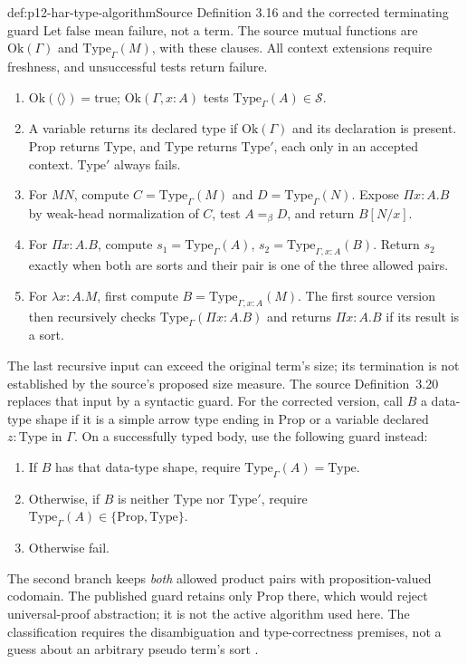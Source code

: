 \begin{hbdefinition}{def:p12-har-type-algorithm}{Source Definition 3.16 and the corrected terminating guard}
Let \(\mathrm{false}\) mean failure, not a term. The source mutual
functions are \(\mathrm{Ok}(\Gamma)\) and
\(\mathrm{Type}_\Gamma(M)\), with these clauses. All context
extensions require freshness, and unsuccessful tests return failure.
\begin{enumerate}
 \item \(\mathrm{Ok}(\langle\rangle)=\mathrm{true}\);
 \(\mathrm{Ok}(\Gamma,x:A)\) tests
 \(\mathrm{Type}_\Gamma(A)\in\mathcal S\).
 \item A variable returns its declared type if
 \(\mathrm{Ok}(\Gamma)\) and its declaration is present.
 \(\mathrm{Prop}\) returns \(\mathrm{Type}\), and
 \(\mathrm{Type}\) returns \(\mathrm{Type}'\), each only in an
 accepted context. \(\mathrm{Type}'\) always fails.
 \item For \(MN\), compute \(C=\mathrm{Type}_\Gamma(M)\)
 and \(D=\mathrm{Type}_\Gamma(N)\). Expose
 \(\Pi x:A.B\) by weak-head normalization of \(C\), test
 \(A=_\beta D\), and return \(B[N/x]\).
 \item For \(\Pi x:A.B\), compute
 \(s_1=\mathrm{Type}_\Gamma(A)\),
 \(s_2=\mathrm{Type}_{\Gamma,x:A}(B)\). Return \(s_2\)
 exactly when both are sorts and their pair is one of the three allowed
 pairs.
 \item For \(\lambda x:A.M\), first compute
 \(B=\mathrm{Type}_{\Gamma,x:A}(M)\). The first source version
 then recursively checks \(\mathrm{Type}_\Gamma(\Pi x:A.B)\)
 and returns \(\Pi x:A.B\) if its result is a sort.
\end{enumerate}
The last recursive input can exceed the original term's size; its
termination is not established by the source's proposed size measure.
The source Definition~3.20 replaces that input by a syntactic guard.
For the corrected version, call \(B\) a data-type shape if it is a
simple arrow type ending in \(\mathrm{Prop}\) or a variable declared
\(z:\mathrm{Type}\) in \(\Gamma\). On a successfully typed
body, use the following guard instead:
\begin{enumerate}
 \item If \(B\) has that data-type shape, require
 \(\mathrm{Type}_\Gamma(A)=\mathrm{Type}\).
 \item Otherwise, if \(B\) is neither \(\mathrm{Type}\) nor
 \(\mathrm{Type}'\), require
 \(\mathrm{Type}_\Gamma(A)\in\{\mathrm{Prop},\mathrm{Type}\}\).
 \item Otherwise fail.
\end{enumerate}
The second branch keeps \emph{both} allowed product pairs with
proposition-valued codomain. The published guard retains only
\(\mathrm{Prop}\) there, which would reject universal-proof
abstraction; it is not the active algorithm used here. The classification
requires the disambiguation and type-correctness premises, not a guess
about an arbitrary pseudo term's sort
\cite[pp.~1192--1195, Definitions~3.16, 3.20; Lemma~3.19]{BarendregtGeuvers2001}.
\end{hbdefinition}

